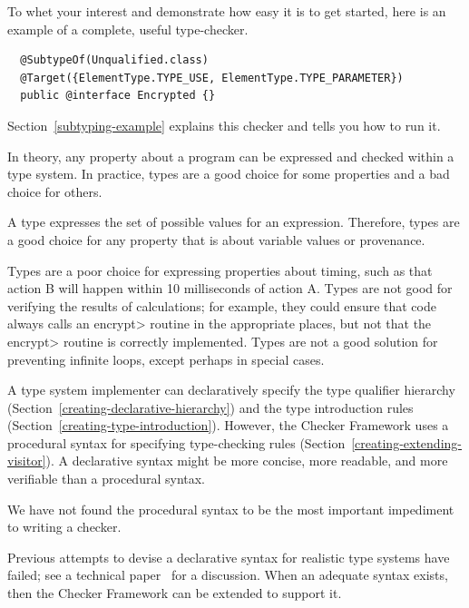To whet your interest and demonstrate how easy it is to get started, here
is an example of a complete, useful type-checker.

\begin{Verbatim}
  @SubtypeOf(Unqualified.class)
  @Target({ElementType.TYPE_USE, ElementType.TYPE_PARAMETER})
  public @interface Encrypted {}
\end{Verbatim}

Section~\ref{subtyping-example} explains this checker and tells
you how to run it.



In theory, any property about a program can be expressed and checked within
a type system.  In practice, types are a good choice for some properties
and a bad choice for others.

A type expresses the set of possible values for an expression.  Therefore,
types are a good choice for any property that is about variable values or
provenance.

Types are a poor choice for expressing properties about timing, such as
that action B will happen within 10 milliseconds of action A.  Types are
not good for verifying the results of calculations; for example, they could
ensure that code always calls an \<encrypt> routine in the appropriate
places, but not that the \<encrypt> routine is correctly implemented.
Types are not a good solution for preventing infinite loops, except perhaps
in special cases.



A type system implementer can declaratively specify the type qualifier
hierarchy (Section~\ref{creating-declarative-hierarchy}) and the type introduction rules
(Section~\ref{creating-type-introduction}).  However, the Checker
Framework uses a procedural syntax for specifying type-checking
rules (Section~\ref{creating-extending-visitor}).
A declarative syntax might be more concise, more readable, and more
verifiable than a procedural syntax.

We have not found the procedural syntax to be the most important impediment
to writing a checker.

Previous attempts to devise a declarative syntax
for realistic type systems have failed; see a technical
paper~\cite{PapiACPE2008} for a discussion.  When an
adequate syntax exists, then the Checker Framework can be extended to
support it.


